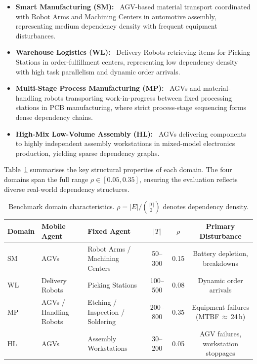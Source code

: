 \documentclass[manuscript,screen,review]{acmart}
\begin{document}
\begin{itemize}
    \item \textbf{Smart Manufacturing (SM):}~\cite{kusiak2018smart} AGV-based material transport
    coordinated with Robot Arms and Machining Centers in automotive assembly,
    representing medium dependency density with frequent equipment disturbances.

    \item \textbf{Warehouse Logistics (WL):}~\cite{boysen2019parts} Delivery Robots retrieving items
    for Picking Stations in order-fulfillment centers, representing low
    dependency density with high task parallelism and dynamic order arrivals.

    \item \textbf{Multi-Stage Process Manufacturing (MP):}~\cite{lee2015cyber} AGVs and
    material-handling robots transporting work-in-progress between fixed
    processing stations in PCB manufacturing, where strict process-stage
    sequencing forms dense dependency chains.

    \item \textbf{High-Mix Low-Volume Assembly (HL):}~\cite{kusiak2018smart} AGVs delivering
    components to highly independent assembly workstations in mixed-model
    electronics production, yielding sparse dependency graphs.
\end{itemize}

Table~\ref{tab:domains} summarises the key structural properties of each domain.
The four domains span the full range $\rho \in [0.05, 0.35]$, ensuring the
evaluation reflects diverse real-world dependency structures.

\begin{table}[t]
\centering
\caption{Benchmark domain characteristics.
$\rho = |E|/\binom{|T|}{2}$ denotes dependency density.}
\label{tab:domains}
\small
\begin{tabular}{@{}lllccc@{}}
\toprule
\textbf{Domain} & \textbf{Mobile Agent} & \textbf{Fixed Agent}
  & \textbf{$|T|$} & \textbf{$\rho$} & \textbf{Primary Disturbance} \\
\midrule
SM & AGVs & Robot Arms / Machining Centers   & 50--300  & 0.15
   & Battery depletion, breakdowns \\
WL & Delivery Robots & Picking Stations      & 100--500 & 0.08
   & Dynamic order arrivals \\
MP & AGVs / Handling Robots
   & Etching / Inspection / Soldering        & 200--800 & 0.35
   & Equipment failures (MTBF\,$\approx$\,24\,h) \\
HL & AGVs & Assembly Workstations            & 30--200  & 0.05
   & AGV failures, workstation stoppages \\
\bottomrule
\end{tabular}
\end{table}
\end{document}

